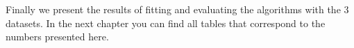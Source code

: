 Finally we present the results of fitting and evaluating the algorithms with the 3 datasets. In the next chapter you can find all tables that correspond to the numbers presented here. 